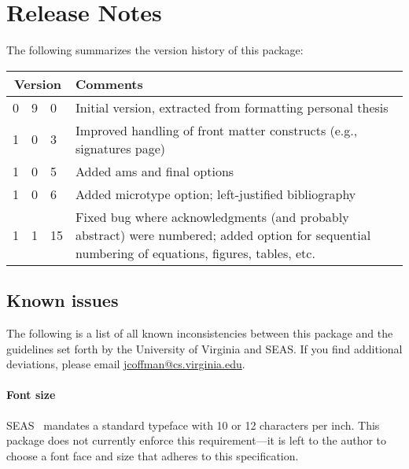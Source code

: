 \documentclass[10pt]{article}
\newcommand{\option}[1]{#1}
\begin{document}


\section{Release Notes}\label{section:release notes}
The following summarizes the version history of this package:
\begin{longtable}{r@{.}r@{.}lp{.8\linewidth}}
  \multicolumn{3}{c}{Version} & Comments\\
  \midrule
  0	& 9	& 0	& Initial version, extracted from formatting personal thesis\\[2ex] %
  1	& 0	& 3	& Improved handling of front matter constructs (e.g., signatures page)\\
  1	& 0	& 5	& Added \option{ams} and \option{final} options\\
  1	& 0	& 6	& Added \option{microtype} option; left-justified bibliography\\
  1	& 1	& 15	& Fixed bug where acknowledgments (and probably abstract) were numbered; added option for sequential numbering of equations, figures, tables, etc.\\
\end{longtable}

\subsection*{Known issues}
The following is a list of all known inconsistencies between this package and the guidelines set forth by the University of Virginia and \gls{SEAS}.
If you find additional deviations, please email \url{jcoffman@cs.virginia.edu}.

\paragraph{Font size}
\Gls{SEAS}~\cite{seas:instructions} mandates a standard typeface with 10 or 12 characters per inch.
This package does not currently enforce this requirement---it is left to the author to choose a font face and size that adheres to this specification.
\end{document}
